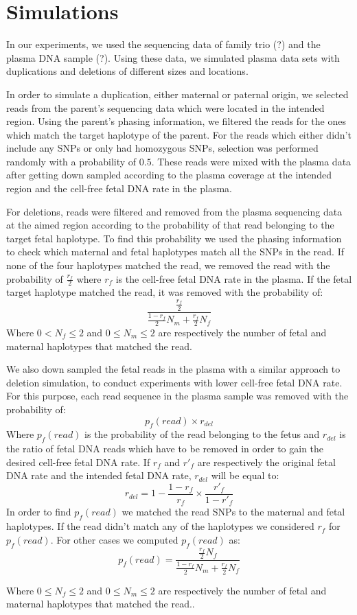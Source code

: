 \section{Simulations}
	In our experiments, we used the sequencing data of family trio (?) and the plasma DNA sample (?). Using these data, we simulated plasma data sets with duplications and deletions of different sizes and locations.

	In order to simulate a duplication, either maternal or paternal origin, we selected reads from the parent's sequencing data which were located in the intended region. Using the parent's phasing information, we filtered the reads for the ones which match the target haplotype of the parent. For the reads which either didn't include any SNPs or only had homozygous SNPs, selection was performed randomly with a probability of $0.5$. These reads were mixed with the plasma data after getting down sampled according to the plasma coverage at the intended region and the cell-free fetal DNA rate in the plasma.
	
	For deletions, reads were filtered and removed from the plasma sequencing data at the aimed region according to the probability of that read belonging to the target fetal haplotype. To find this probability we used the phasing information to check which maternal and fetal haplotypes match all the SNPs in the read. If none of the four haplotypes matched the read, we removed the read with the probability of $\frac{r_f}{2}$ where $r_f$ is the cell-free fetal DNA rate in the plasma. If the fetal target haplotype matched the read, it was removed with the probability of:
	$$\frac{ \frac{r_f}{2} } { \frac{1-r_f}{2} N_m + \frac{r_f}{2} N_f}$$
	Where $0 < N_f \leq 2$ and $0 \leq N_m \leq 2$ are respectively the number of fetal and maternal haplotypes that matched the read.
	
	We also down sampled the fetal reads in the plasma with a similar approach to deletion simulation, to conduct experiments with lower cell-free fetal DNA rate. For this purpose, each read sequence in the plasma sample was removed with the probability of:
	 $$p_f(read) \times r_{del}$$
	 Where $p_f(read)$ is the probability of the read belonging to the fetus and $r_{del}$ is the ratio of fetal DNA reads which have to be removed in order to gain the desired cell-free fetal DNA rate. If $r_f$ and $r'_f$ are respectively the original fetal DNA rate and the intended fetal DNA rate, $r_{del}$ will be equal to:
	 $$r_{del}= 1 - \frac{1 - r_f } { r_f} \times \frac{r'_f}{1-r'_f}$$
	 In order to find $p_f(read)$ we matched the read SNPs to the maternal and fetal haplotypes. If the read didn't match any of the haplotypes we considered $r_f$ for $p_f(read)$. For other cases we computed $p_f(read)$ as:
	 $$p_f(read)= \frac{ \frac{r_f}{2}N_f } { \frac{1-r_f}{2} N_m + \frac{r_f}{2} N_f}$$
	 	 
	Where $0 \leq N_f \leq 2$ and $0 \leq N_m \leq 2$ are respectively the number of fetal and maternal haplotypes that matched the read..
